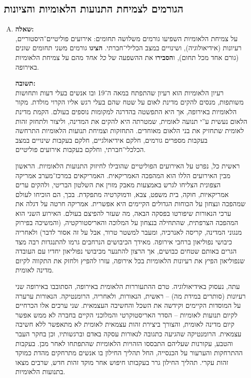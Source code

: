 \documentclass[a4paper]{article}
\newcommand\hl[1]   {#1}
\begin{document}
	\subsection{הגורמים לצמיחת התנועות הלאומיות והציונות}
		\begin{enumerate}[A.]
			\item \textbf{שאלה: }\\
			על צמיחת הלאומיות השפיעו גורמים משלושה תחומים: אירועים פוליטיים־היסטוריים, רעיונות (אידיאולוגיה), ושינויים במצב הכלילי־חברתי. \textbf{הציגו} גורמים מ\textit{שני} תחומים שונים (גורם אחד מכל תחום), ו\textbf{הסבירו} את ההשפעה של \textit{כל אחד} מהם על צמיחת הלאומיות באירופה. 
			
			\textbf{תשובה: }\\
			רעיון הלאומיות הוא רעיון שהתפתח במאה ה־19 ובו אנשים בעלי דעות ותחושות משותפות, מנסים להקים \hl{מדינת לאום} על שטח שהם בעלי רגש אליו הקרוי \hl{מולדת}. מקור הלאומיות באירופה, אך היא התפשטה בהדרגה למקומות נוספים בעולם. הקמת מדינת הלאום נעשית ע''י \hl{תנועה לאומית}, שמטרתה היא להקים את המדינה, וליצור ולתחזק \hl{זהות לאומית} שתחזיק את בני הלאום מאוחדים. התחזקות וצמיחת תנועות הלאומיות התרחשה בעקבות מספרים גורמים, חלקם אידיאולגיים, חלקם בעקבות שינויים במצב הכלכלי־חברתי, וחלקם בעקבות אירועים פוליטיים. 
			
			ראשית כל, נפרט על האירועים הפוליטיים שהובילו לחיזוק התנועות הלאומיות. הראשון מבין האירועים הללו הוא \hl{המהפכה האמריקאית}. האמריקאים במרכז־מערב אמריקה הצפונית הצליחו לגרש באמצעות מאבק מזוין את השלטון הבריטי, ולהקים ערים אמריקאיות, חוקה, בית משפט, צבא, ודמוקרטיה מתפקדת. בכך, הם הוכיחו לעולם שמהפכה ונצחון על הכוחות הגדולים הקיימים היא אפשרית. אמריקה חרטה על דגלה את ערכי הנאורות שיפורטו בפסקה הבאה, מה שעזר להפיצם בעולם. האירוע השני הוא \hl{המהפכה הצרפתית}, שהתחילה בנצחון על המלוכה והאריסטורקטיה, (והמשיכה בפירוק מנגוני המדינה, קריסה לאנרכיה, ומעבר למשטר טרור, אבל על זה אסור לדבר) ולאחריה \hl{כיבושי נפוליאון} ברחבי אירופה. מאידך הכיבושים הנרחבים גרמו להתנגדות רבה מצד הגרים באותם שטחים כבושים, אך הרצון להתנער מכיבושי נפוליאון יחדיו עם העובדה שנפוליאון הפיץ את רעיונות הלאומיות בכל אירופה, עזרו להפיץ ולחזק את התקווה לקיום מדינה לאומית. 
			
			עתה, נעסוק באידיאולוגיה. טרם ההתעוררות הלאומית באירופה, הסתובבו באירופה שני רעיונות (סותרים במידת מה) – ראשית, הנאורות, ולאחריה, הרומנטיקה. הנאורות ערערה על המוסדות הקיימים וקידשה את השכל והחשיבה העצמאית. שני ערכים אלו הכרחיים לקיום תנועות לאומיות – הסדר האריסטוקרטי והמלוכני הקיים בחברה לא ממש אפשר קיום מדינה לאומית, והצורך ביצירת זהות עצמאית לאומית לא מתאפשר ללא חשיבה עצמאית. ה\hl{רומנטיקה} שהגיעה כתגובה לנאורות עסקה באדם וברגשותיו, וכן בחקר העבר והטבע, עקורנות שעליהם התבססו הזהויות הלאומיות שהתפתחו לאחר מכן. בעקבות ההתרחקות והערעור על הכנסייה, החל תהליך ה\hl{חילון} בו אנשים מתרחקים מהדת כמוקד זהות עקרי. תהליך החילון גרר בעקבותו חיפוש אחר מוקד זהות חדש, שרבים מצאו בתנועות הלאומיות. 
			

\end{enumerate}
\end{document}
